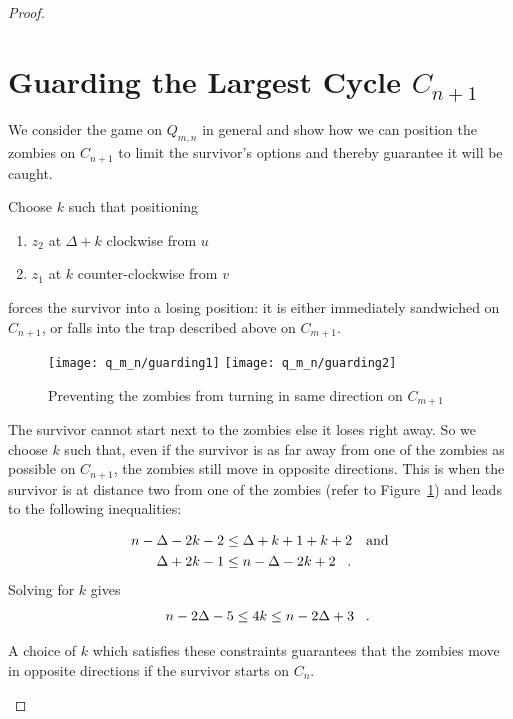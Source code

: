 \begin{proof}
  \section{Guarding the Largest Cycle $C_{n+1}$\label{thm q_m_n 2}}
\begin{proofpart}
  We consider the game on $Q_{m,n}$ in general and show
  how we can position the zombies on $C_{n+1}$ to limit the survivor's options and thereby guarantee it will be caught.


  Choose $k$ such that positioning
  \begin{enumerate}
   \item $z_2$ at $\Delta + k$ clockwise from $u$
   \item $z_1$ at $k$ counter-clockwise from $v$
  \end{enumerate}
  forces the survivor into a losing position: it is either immediately sandwiched on $C_{n+1}$,
  or falls into the trap described above on $C_{m+1}$.

  \begin{figure}
    \centering
    \texttt{[image: q\_m\_n/guarding1]}
    \texttt{[image: q\_m\_n/guarding2]}
    \caption{Preventing the zombies from turning in same direction on $C_{m+1}$\label{fig:guarding}}
  \end{figure}

  The survivor cannot start next to the zombies else it loses right away.
  So we choose $k$ such that, even if the survivor is as far away from one of the zombies as possible on $C_{n+1}$, the zombies still move in opposite directions. This is when the survivor is at distance two from one of the zombies (refer to Figure~\ref{fig:guarding}) and leads to the following inequalities:

  \begin{align*}
   n - \Delta - 2k - 2 &\leq \Delta + k +1 + k +2 && \text{and} \\
   \Delta + 2k -1 &\leq n - \Delta -2k +2 \mperiod
  \end{align*}
  Solving for $k$ gives
  \[ n - 2\Delta -5 \leq 4k \leq n-2\Delta +3 \mperiod \]

  A choice of $k$ which satisfies these constraints guarantees that the zombies move in opposite directions if the survivor starts on $C_n$.


\end{proofpart}
\end{proof}
